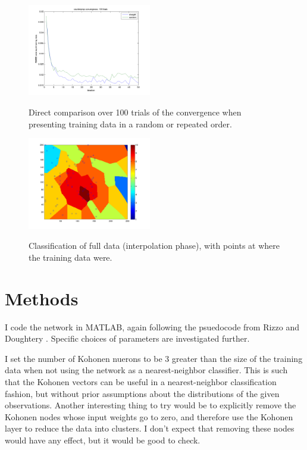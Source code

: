 \documentclass[pre,twocolumn,twoside,byrevtex,superscriptaddress]{revtex4}
\begin{document}
\begin{figure}[h]
 \centering
  \includegraphics[width=0.48\textwidth]{115.png}
  \label{fig:5}
  \caption{Direct comparison over 100 trials of the convergence when presenting training data in a random or repeated order.}
\end{figure}

\begin{figure}[h]
 \centering
  \includegraphics[width=0.48\textwidth]{116-wpoints.png}
  \label{fig:10}
  \caption{Classification of full data (interpolation phase), with points at where the training data were.}
\end{figure}

\section{Methods}

I code the network in MATLAB, again following the psuedocode from Rizzo and Doughtery \cite{rizzo1994characterization}.
Specific choices of parameters are investigated further.

I set the number of Kohonen nuerons to be 3 greater than the size of the training data when not using the network as a nearest-neighbor classifier.
This is such that the Kohonen vectors can be useful in a nearest-neighbor classification fashion, but without prior assumptions about the distributions of the given observations.
Another interesting thing to try would be to explicitly remove the Kohonen nodes whose input weights go to zero, and therefore use the Kohonen layer to reduce the data into clusters.
I don't expect that removing these nodes would have any effect, but it would be good to check.
\end{document}
